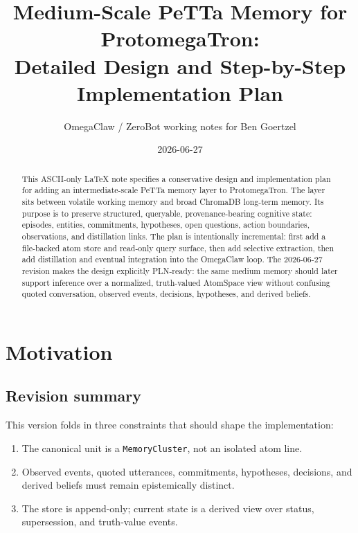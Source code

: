 \documentclass[11pt]{article}
\title{Medium-Scale PeTTa Memory for ProtomegaTron:\\
Detailed Design and Step-by-Step Implementation Plan}
\author{OmegaClaw / ZeroBot working notes for Ben Goertzel}
\date{2026-06-27}
\begin{document}
\maketitle

\begin{abstract}
This ASCII-only LaTeX note specifies a conservative design and implementation plan
for adding an intermediate-scale PeTTa memory layer to ProtomegaTron.  The layer
sits between volatile working memory and broad ChromaDB long-term memory.  Its
purpose is to preserve structured, queryable, provenance-bearing cognitive state:
episodes, entities, commitments, hypotheses, open questions, action boundaries,
observations, and distillation links.  The plan is intentionally incremental: first
add a file-backed atom store and read-only query surface, then add selective
extraction, then add distillation and eventual integration into the OmegaClaw loop.
The 2026-06-27 revision makes the design explicitly PLN-ready: the same medium
memory should later support inference over a normalized, truth-valued AtomSpace
view without confusing quoted conversation, observed events, decisions, hypotheses,
and derived beliefs.
\end{abstract}

\section{Motivation}

\subsection{Revision summary}

This version folds in three constraints that should shape the implementation:
\begin{enumerate}
  \item The canonical unit is a \texttt{MemoryCluster}, not an isolated atom line.
  \item Observed events, quoted utterances, commitments, hypotheses, decisions, and
        derived beliefs must remain epistemically distinct.
  \item The store is append-only; current state is a derived view over status,
        supersession, and truth-value events.
\end{enumerate}
\end{document}
